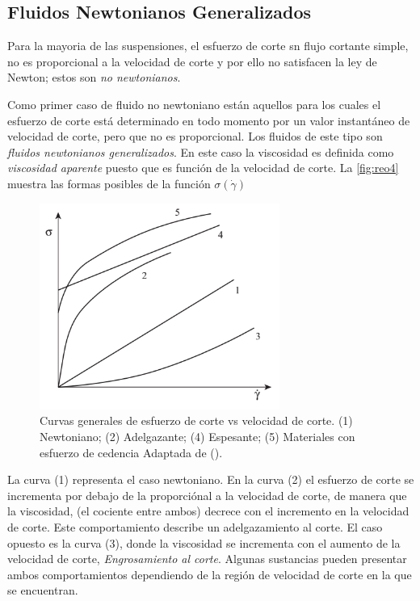\subsection{Fluidos Newtonianos Generalizados}
Para la mayoria de las suspensiones, el esfuerzo de corte sn flujo cortante simple, no es proporcional a la velocidad de corte y por ello no satisfacen la ley de Newton; estos son \emph{no newtonianos}.

Como primer caso de fluido no newtoniano están aquellos para los cuales el esfuerzo de corte está determinado en todo momento por un valor instantáneo de velocidad de corte, pero que no es proporcional. Los fluidos de este tipo son \emph{fluidos newtonianos generalizados}. En este caso la viscosidad es definida como \emph{viscosidad aparente} puesto que es función de la velocidad de corte. La \autoref{fig:reo4} muestra las formas posibles de la función $\sigma(\dot{\gamma})$

\begin{figure}\centering
    \includegraphics[width=0.7\textwidth]{Graphics/reo4.png}
    \caption[Curvas reológicas generales]{Curvas generales de esfuerzo de corte vs velocidad de corte. (1) Newtoniano; (2) Adelgazante; (4) Espesante; (5) Materiales con esfuerzo de cedencia Adaptada de ().}
    \label{fig:reo4}
\end{figure}

La curva (1) representa el caso newtoniano. En la curva (2) el esfuerzo de corte se incrementa por debajo de la proporciónal a la velocidad de corte, de manera que la viscosidad, (el cociente entre ambos) decrece con el incremento en la velocidad de corte. Este comportamiento describe un adelgazamiento al corte. El caso opuesto es la curva (3), donde la viscosidad se incrementa con el aumento de la velocidad de corte, \emph{Engrosamiento al corte}. Algunas sustancias pueden presentar ambos comportamientos dependiendo de la región de velocidad de corte en la que se encuentran.

